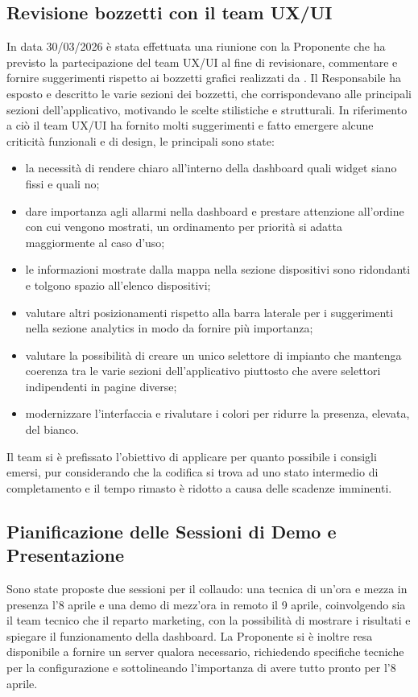 \documentclass[10pt, letterpaper]{article}
\begin{document}
\subsection*{Revisione bozzetti con il team UX/UI}
In data 30/03/2026 è stata effettuata una riunione con la Proponente che ha previsto la partecipazione del team UX/UI al fine di revisionare, commentare 
e fornire suggerimenti rispetto ai bozzetti grafici realizzati da \teamName. Il Responsabile ha esposto e descritto le varie sezioni dei bozzetti, che corrispondevano alle 
principali sezioni dell'applicativo, motivando le scelte stilistiche e strutturali.
In riferimento a ciò il team UX/UI ha fornito molti suggerimenti e fatto emergere alcune criticità funzionali e di design, le principali sono state:
\begin{itemize}
      \item la necessità di rendere chiaro all'interno della dashboard quali widget siano fissi e quali no;
      \item dare importanza agli allarmi nella dashboard e prestare attenzione all'ordine con cui vengono mostrati, un ordinamento per priorità si adatta maggiormente al caso d'uso;
      \item le informazioni mostrate dalla mappa nella sezione dispositivi sono ridondanti e tolgono spazio all'elenco dispositivi;
      \item valutare altri posizionamenti rispetto alla barra laterale per i suggerimenti nella sezione analytics in modo da fornire più importanza;
      \item valutare la possibilità di creare un unico selettore di impianto che mantenga coerenza tra le varie sezioni dell'applicativo piuttosto che avere selettori indipendenti in pagine diverse;
      \item modernizzare l'interfaccia e rivalutare i colori per ridurre la presenza, elevata, del bianco.
\end{itemize}
Il team si è prefissato l'obiettivo di applicare per quanto possibile i consigli emersi, pur considerando che la codifica si trova ad uno stato intermedio di completamento e il tempo rimasto è ridotto a causa 
delle scadenze imminenti.

\subsection*{Pianificazione delle Sessioni di Demo e Presentazione}
Sono state proposte due sessioni per il collaudo: una tecnica di un'ora e mezza in presenza l'8 aprile e una demo di mezz'ora in remoto il 9 aprile,
coinvolgendo sia il team tecnico che il reparto marketing, con la possibilità di mostrare i risultati e spiegare il funzionamento della dashboard. 
La Proponente si è inoltre resa disponibile a fornire un server qualora necessario, richiedendo specifiche tecniche per la configurazione 
e sottolineando l'importanza di avere tutto pronto per l'8 aprile.
\end{document}
